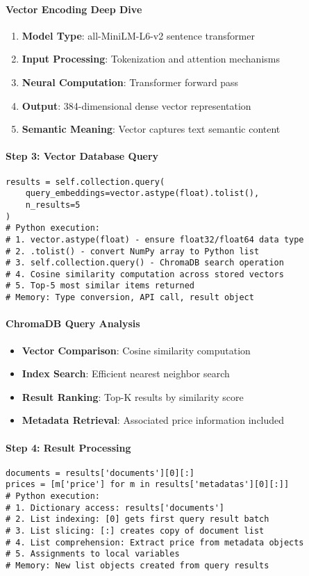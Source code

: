 \paragraph{Vector Encoding Deep Dive}
\begin{enumerate}
\item \textbf{Model Type}: all-MiniLM-L6-v2 sentence transformer
\item \textbf{Input Processing}: Tokenization and attention mechanisms
\item \textbf{Neural Computation}: Transformer forward pass
\item \textbf{Output}: 384-dimensional dense vector representation
\item \textbf{Semantic Meaning}: Vector captures text semantic content
\end{enumerate}

\paragraph{Step 3: Vector Database Query}
\begin{lstlisting}[caption=ChromaDB Similarity Search]
results = self.collection.query(
    query_embeddings=vector.astype(float).tolist(), 
    n_results=5
)
# Python execution:
# 1. vector.astype(float) - ensure float32/float64 data type
# 2. .tolist() - convert NumPy array to Python list
# 3. self.collection.query() - ChromaDB search operation
# 4. Cosine similarity computation across stored vectors
# 5. Top-5 most similar items returned
# Memory: Type conversion, API call, result object
\end{lstlisting}

\paragraph{ChromaDB Query Analysis}
\begin{itemize}
\item \textbf{Vector Comparison}: Cosine similarity computation
\item \textbf{Index Search}: Efficient nearest neighbor search
\item \textbf{Result Ranking}: Top-K results by similarity score
\item \textbf{Metadata Retrieval}: Associated price information included
\end{itemize}

\paragraph{Step 4: Result Processing}
\begin{lstlisting}[caption=Query Result Extraction]
documents = results['documents'][0][:]
prices = [m['price'] for m in results['metadatas'][0][:]]
# Python execution:
# 1. Dictionary access: results['documents']
# 2. List indexing: [0] gets first query result batch
# 3. List slicing: [:] creates copy of document list
# 4. List comprehension: Extract price from metadata objects
# 5. Assignments to local variables
# Memory: New list objects created from query results
\end{lstlisting}

